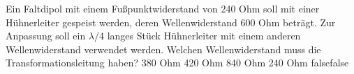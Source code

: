     {Ein Faltdipol mit einem Fußpunktwiderstand von 240 Ohm soll mit einer Hühnerleiter gespeist werden, deren Wellenwiderstand 600 Ohm beträgt. Zur Anpassung soll ein $\lambda$/4 langes Stück Hühnerleiter mit einem anderen Wellenwiderstand verwendet werden. Welchen Wellenwiderstand muss die Transformationsleitung haben?}
    {380 Ohm}
    {420 Ohm}
    {840 Ohm}
    {240 Ohm}
    {false}{false}